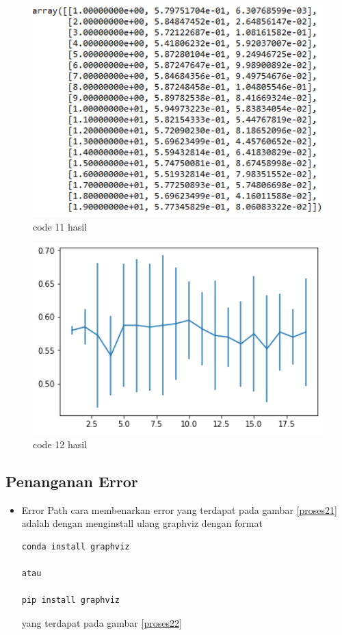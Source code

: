 \begin{itemize}
\begin{figure}
\centerline{\includegraphics[width=1\textwidth]{figures/fathi/chapter2/chapter3/11.PNG}}
\caption{code 11 hasil}
\label{proses11}
\end{figure}

\begin{figure}
\centerline{\includegraphics[width=1\textwidth]{figures/fathi/chapter2/chapter3/12.PNG}}
\caption{code 12 hasil}
\label{proses12}
\end{figure}

\end{itemize}

\subsection {Penanganan Error}
\begin{itemize}
\item Error Path
\subitem
cara membenarkan error yang terdapat pada gambar \ref{proses21} adalah dengan menginstall ulang graphviz dengan format 
\begin{verbatim}
conda install graphviz

atau

pip install graphviz
\end{verbatim}
yang terdapat pada gambar \ref{proses22}
\end{itemize}


